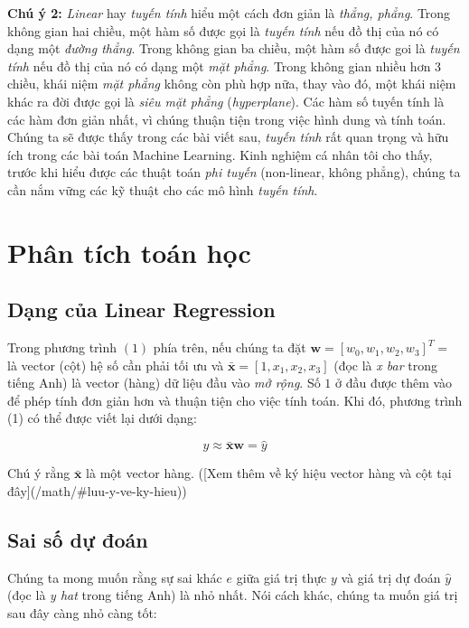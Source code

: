 \textbf{Chú ý 2:} \textit{Linear} hay \textit{tuyến tính} hiểu một cách đơn giản là \textit{thẳng, phẳng}. Trong không gian hai chiều, một hàm số được gọi là \textit{tuyến tính} nếu đồ thị của nó có dạng một \textit{đường thẳng}. Trong không gian ba chiều, một hàm số được goi là \textit{tuyến tính} nếu đồ thị của nó có dạng một \textit{mặt phẳng}. Trong không gian nhiều hơn 3 chiều, khái niệm \textit{mặt phẳng} không còn phù hợp nữa, thay vào đó, một khái niệm khác ra đời được gọi là \textit{siêu mặt phẳng} (\textit{hyperplane}). Các hàm số tuyến tính là các hàm đơn giản nhất, vì chúng thuận tiện trong việc hình dung và tính toán. Chúng ta sẽ được thấy trong các bài viết sau, \textit{tuyến tính} rất quan trọng và hữu ích trong các bài toán Machine Learning. Kinh nghiệm cá nhân tôi cho thấy, trước khi hiểu được các thuật toán \textit{phi tuyến} (non-linear, không phẳng), chúng ta cần nắm vững các kỹ thuật cho các mô hình \textit{tuyến tính}.





\section{Phân tích toán học}



\subsection{Dạng của Linear Regression }
Trong phương trình $(1)$ phía trên, nếu chúng ta đặt $\mathbf{w} = [w_0, w_1, w_2, w_3]^T = $ là vector (cột) hệ số cần phải tối ưu và $\mathbf{\bar{x}} = [1, x_1, x_2, x_3]$ (đọc là \textit{x bar} trong tiếng Anh) là vector (hàng) dữ liệu đầu vào \textit{mở rộng}. Số $1$ ở đầu được thêm vào để phép tính đơn giản hơn và thuận tiện cho việc tính toán. Khi đó, phương trình (1) có thể được viết lại dưới dạng:

$$y \approx \mathbf{\bar{x}}\mathbf{w} = \hat{y}$$

Chú ý rằng $\mathbf{\bar{x}}$ là một vector hàng. ([Xem thêm về ký hiệu vector hàng và cột tại đây](/math/#luu-y-ve-ky-hieu))



\subsection{Sai số dự đoán }
Chúng ta mong muốn rằng sự sai khác $e$ giữa giá trị thực $y$ và giá trị dự đoán $\hat{y}$ (đọc là \textit{y hat} trong tiếng Anh) là nhỏ nhất. Nói cách khác, chúng ta muốn giá trị sau đây càng nhỏ càng tốt: 

